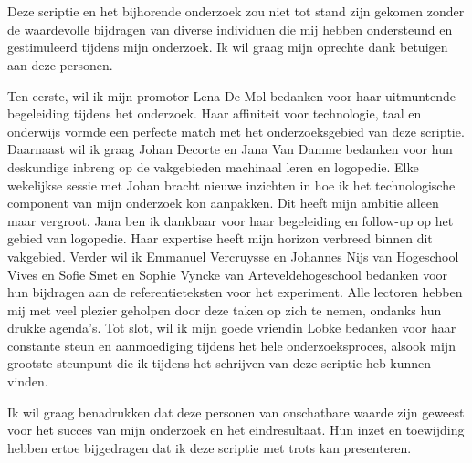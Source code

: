 
\chapter*{}%
\label{ch:voorwoord}

Deze scriptie en het bijhorende onderzoek zou niet tot stand zijn gekomen zonder de waardevolle bijdragen van diverse individuen die mij hebben ondersteund en gestimuleerd tijdens mijn onderzoek. Ik wil graag mijn oprechte dank betuigen aan deze personen.

\medspace

Ten eerste, wil ik mijn promotor Lena De Mol bedanken voor haar uitmuntende begeleiding tijdens het onderzoek. Haar affiniteit voor technologie, taal en onderwijs vormde een perfecte match met het onderzoeksgebied van deze scriptie. Daarnaast wil ik graag Johan Decorte en Jana Van Damme bedanken voor hun deskundige inbreng op de vakgebieden machinaal leren en logopedie. Elke wekelijkse sessie met Johan bracht nieuwe inzichten in hoe ik het technologische component van mijn onderzoek kon aanpakken. Dit heeft mijn ambitie alleen maar vergroot. Jana ben ik dankbaar voor haar begeleiding en follow-up op het gebied van logopedie. Haar expertise heeft mijn horizon verbreed binnen dit vakgebied. Verder wil ik Emmanuel Vercruysse en Johannes Nijs van Hogeschool Vives en Sofie Smet en Sophie Vyncke van Arteveldehogeschool bedanken voor hun bijdragen aan de referentieteksten voor het experiment. Alle lectoren hebben mij met veel plezier geholpen door deze taken op zich te nemen, ondanks hun drukke agenda’s. Tot slot, wil ik mijn goede vriendin Lobke bedanken voor haar constante steun en aanmoediging tijdens het hele onderzoeksproces, alsook mijn grootste steunpunt die ik tijdens het schrijven van deze scriptie heb kunnen vinden.

\medspace

Ik wil graag benadrukken dat deze personen van onschatbare waarde zijn geweest voor het succes van mijn onderzoek en het eindresultaat. Hun inzet en toewijding hebben ertoe bijgedragen dat ik deze scriptie met trots kan presenteren.